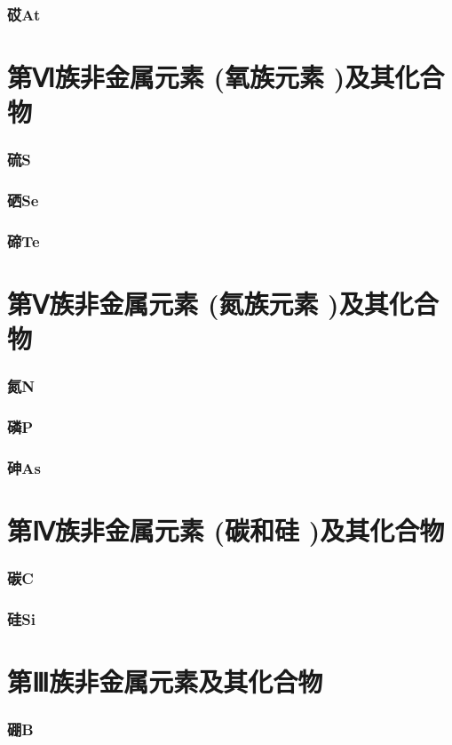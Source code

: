 \documentclass[UTF8]{../03-Chemistry}
\begin{document}
    \subsubsection{砹At}
\section{第Ⅵ族非金属元素 (氧族元素 )及其化合物}
    \subsubsection{硫S}
    \subsubsection{硒Se}
    \subsubsection{碲Te}
\section{第Ⅴ族非金属元素 (氮族元素 )及其化合物}
    \subsubsection{氮N}
    \subsubsection{磷P}
    \subsubsection{砷As}
\section{第Ⅳ族非金属元素 (碳和硅 )及其化合物}
    \subsubsection{碳C}
    \subsubsection{硅Si}
\section{第Ⅲ族非金属元素及其化合物}
    \subsubsection{硼B}
\end{document}
